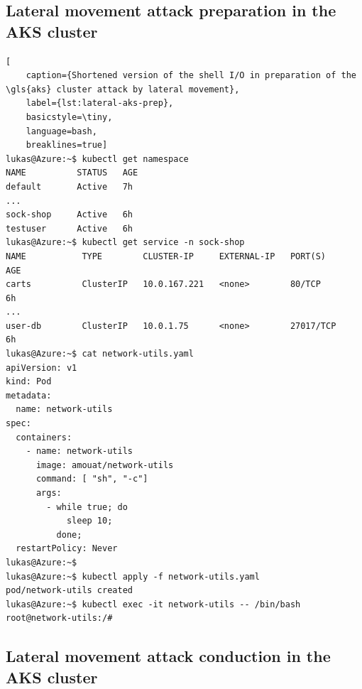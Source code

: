 \subsection{Lateral movement attack preparation in the AKS cluster}
\begin{lstlisting}[
	caption={Shortened version of the shell I/O in preparation of the \gls{aks} cluster attack by lateral movement},
	label={lst:lateral-aks-prep},
	basicstyle=\tiny,
	language=bash,
	breaklines=true]
lukas@Azure:~$ kubectl get namespace
NAME          STATUS   AGE
default       Active   7h
...
sock-shop     Active   6h
testuser      Active   6h
lukas@Azure:~$ kubectl get service -n sock-shop
NAME           TYPE        CLUSTER-IP     EXTERNAL-IP   PORT(S)        AGE
carts          ClusterIP   10.0.167.221   <none>        80/TCP         6h
...
user-db        ClusterIP   10.0.1.75      <none>        27017/TCP      6h
lukas@Azure:~$ cat network-utils.yaml
apiVersion: v1
kind: Pod
metadata:
  name: network-utils
spec:
  containers:
    - name: network-utils
      image: amouat/network-utils
      command: [ "sh", "-c"]
      args:
        - while true; do
            sleep 10;
          done;
  restartPolicy: Never
lukas@Azure:~$
lukas@Azure:~$ kubectl apply -f network-utils.yaml
pod/network-utils created
lukas@Azure:~$ kubectl exec -it network-utils -- /bin/bash
root@network-utils:/#
\end{lstlisting}

\subsection{Lateral movement attack conduction in the AKS cluster}

